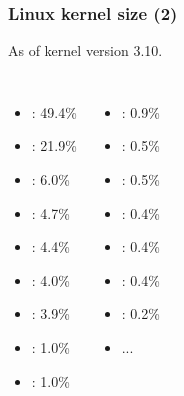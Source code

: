 \begin{frame}
  \frametitle{Linux kernel size (2)}
  As of kernel version 3.10.
  \begin{columns}
    \begin{itemize}
    \item {}: 49.4\%
    \item {}: 21.9\%
    \item {}: 6.0\%
    \item {}: 4.7\%
    \item {}: 4.4\%
    \item {}: 4.0\%
    \item {}: 3.9\%
    \item {}: 1.0\%
    \item {}: 1.0\%
    \end{itemize}
    \begin{itemize}
    \item {}: 0.9\%
    \item {}: 0.5\%
    \item {}: 0.5\%
    \item {}: 0.4\%
    \item {}: 0.4\%
    \item {}: 0.4\%
    \item {}: 0.2\%
    \item ...
    \end{itemize}
  \end{columns}
\end{frame}

